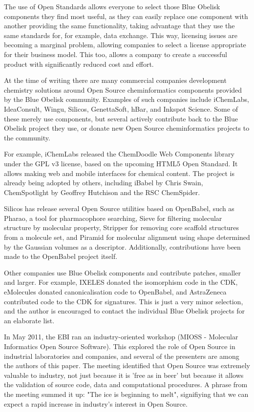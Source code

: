 \documentclass[10pt]{bmc_article}
\newenvironment{bmcformat}{\fussy\setboolean{publ}{true}}{\fussy}
\begin{document}
\begin{bmcformat}
The use of Open Standards allows everyone to select those Blue Obelisk components
they find most useful, as they can easily replace one component with another providing
the same functionality, taking advantage that they use the same standards for,
for example, data exchange. This way, licensing issues are becoming a marginal
problem, allowing companies to select a license appropriate for their business
model. This too, allows a company to create a successful product with significantly
reduced cost and effort.

At the time of writing there are many commercial companies development chemistry
solutions around Open Source cheminformatics components provided by the Blue Obelisk
community. Examples of such companies include iChemLabs, IdeaConsult, Wingu, Silicos,
GenettaSoft, hBar, and Inkspot Science. Some of these merely use components, but several
actively contribute back to the Blue Obelisk project they use, or donate new
Open Source cheminformatics projects to the community.

For example, iChemLabs released the ChemDoodle Web Components library under the GPL v3
license, based on the upcoming HTML5 Open Standard. It allows making web and mobile
interfaces for chemical content. The project is already being adopted by others,
including iBabel by Chris Swain\cite{iBabel}, ChemSpotlight by
Geoffrey Hutchison\cite{chemspotlight} and the RSC ChemSpider\cite{chemspider_chemdoodle}.

Silicos has release several Open Source utilities based on
OpenBabel, such as Pharao, a tool for pharmacophore searching,
Sieve for filtering molecular structure by molecular property,
Stripper for removing core scaffold structures from a molecule
set, and Piramid for molecular alignment using shape determined
by the Gaussian volumes as a descriptor. Additionally,
contributions have been made to the OpenBabel project itself.

Other companies use Blue Obelisk components and contribute patches,
smaller and larger. For example, IXELES donated the isomorphism
code in the CDK, eMolecules donated canonicalisation code to
OpenBabel, and AstraZeneca contributed code to the CDK for
signatures. This is just a very minor selection, and the author
is encouraged to contact the individual Blue Obelisk projects
for an elaborate list.

In May 2011, the EBI ran an industry-oriented workshop (MIOSS -
Molecular Informatics Open Source Software). This explored the role of
Open Source in industrial laboratories and companies, and several of
the presenters are among the authors of this paper.
The meeting identified that Open Source was extremely valuable to
industry, not just because it is 'free as in beer'
but because it allows the validation of source code, data and
computational procedures. A phrase from the meeting
summed it up: "The ice is beginning to melt", signifiying that we can
expect a rapid increase in industry's interest
in Open Source.


\end{bmcformat}
\end{document}
